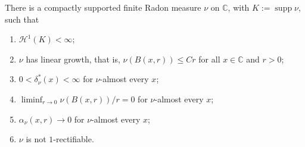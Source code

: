 \documentclass[11pt,a4paper,english,reqno]{amsart}
\newcommand{\hd}[1]{\mathcal{H}^{#1}}
\numberwithin{equation}{section}
\newcommand{\CC}[0]{\mathbb{C}}
\DeclareMathOperator{\supp}{supp}
\numberwithin{definition}{section}
\begin{document}
\begin{theorem}\label{thm:preiss-core-alpha}
  There is a compactly supported finite Radon measure $\nu$ on $\CC$, with $K:=\supp\nu$, such that
  \begin{enumerate}
    \item $\hd1(K)<\infty$;
    \item $\nu$ has linear growth, that is, $\nu(B(x,r))\le Cr$ for all $x\in\CC$ and $r>0$;
    \item $0<\delta_\nu^*(x)<\infty$ for $\nu$-almost every $x$;
    \item $\displaystyle \liminf_{r\to0}\nu(B(x,r))/r=0$ for $\nu$-almost every $x$;
    \item $\alpha_{\nu}(x,r)\to0$ for $\nu$-almost every $x$;
    \item $\nu$ is not $1$-rectifiable.
  \end{enumerate}
\end{theorem}
\end{document}
